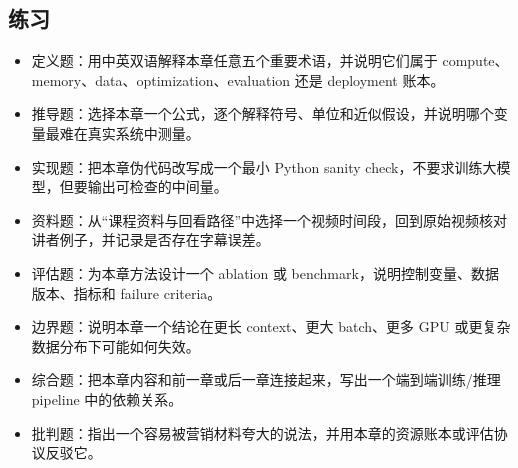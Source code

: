 \documentclass[a4paper]{article}
\begin{document}
\subsection{练习}
\begin{itemize}
\item 定义题：用中英双语解释本章任意五个重要术语，并说明它们属于 compute、memory、data、optimization、evaluation 还是 deployment 账本。
\item 推导题：选择本章一个公式，逐个解释符号、单位和近似假设，并说明哪个变量最难在真实系统中测量。
\item 实现题：把本章伪代码改写成一个最小 Python sanity check，不要求训练大模型，但要输出可检查的中间量。
\item 资料题：从“课程资料与回看路径”中选择一个视频时间段，回到原始视频核对讲者例子，并记录是否存在字幕误差。
\item 评估题：为本章方法设计一个 ablation 或 benchmark，说明控制变量、数据版本、指标和 failure criteria。
\item 边界题：说明本章一个结论在更长 context、更大 batch、更多 GPU 或更复杂数据分布下可能如何失效。
\item 综合题：把本章内容和前一章或后一章连接起来，写出一个端到端训练/推理 pipeline 中的依赖关系。
\item 批判题：指出一个容易被营销材料夸大的说法，并用本章的资源账本或评估协议反驳它。
\end{itemize}
\end{document}
